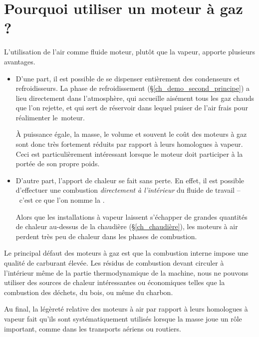 \section{Pourquoi utiliser un moteur à gaz ?}

	L’utilisation de l’air comme fluide moteur, plutôt que la vapeur, apporte plusieurs avantages.

	\begin{itemize}
		\item D’une part, il est possible de se dispenser entièrement des condenseurs et refroidisseurs. La phase de refroidissement (\S\ref{ch_demo_second_principe}) a lieu directement dans l’atmosphère, qui accueille aisément tous les gaz chauds que l’on rejette, et qui sert de réservoir dans lequel puiser de l’air frais pour réalimenter le~moteur.

		À puissance égale, la masse, le volume et souvent le coût des moteurs à gaz sont donc très fortement réduits par rapport à leurs homologues à vapeur. Ceci est particulièrement intéressant lorsque le moteur doit participer à la portée de son propre poids.

		\item D’autre part, l’apport de chaleur se fait sans perte. En effet, il est possible d’effectuer une combustion \emph{directement à l’intérieur} du fluide de travail --\ c’est ce que l’on nomme la .

		Alors que les installations à vapeur laissent s’échapper de grandes quantités de chaleur au-dessus de la chaudière (\S\ref{ch_chaudière}), les moteurs à air perdent très peu de chaleur dans les phases de combustion.
	\end{itemize}

	Le principal défaut des moteurs à gaz est que la combustion interne impose une qualité de carburant élevée. Les résidus de combustion devant circuler à l’intérieur même de la partie thermodynamique de la machine, nous ne pouvons utiliser des sources de chaleur intéressantes ou économiques telles que la combustion des déchets, du bois, ou même du charbon.

	Au final, la légèreté relative des moteurs à air par rapport à leurs homologues à vapeur fait qu’ils sont systématiquement utilisés lorsque la masse joue un rôle important, comme dans les transports aériens ou routiers.



